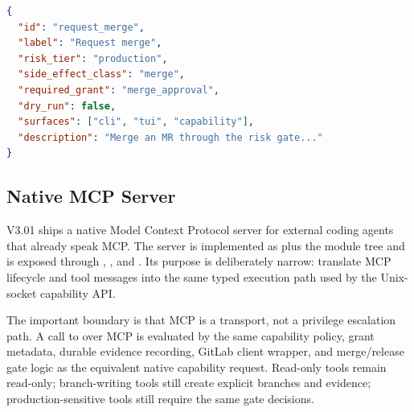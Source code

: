 \begin{lstlisting}[style=api,language=json,caption={Action registry JSON excerpt}]
{
  "id": "request_merge",
  "label": "Request merge",
  "risk_tier": "production",
  "side_effect_class": "merge",
  "required_grant": "merge_approval",
  "dry_run": false,
  "surfaces": ["cli", "tui", "capability"],
  "description": "Merge an MR through the risk gate..."
}
\end{lstlisting}

\clearpage
\twocolumn
\flushbottom
\subsection{Native MCP Server}
\label{app:mcp-server}

V3.01 ships a native Model Context Protocol server for external coding agents that already speak MCP. The server is implemented as  plus the  module tree and is exposed through , , and . Its purpose is deliberately narrow: translate MCP lifecycle and tool messages into the same typed  execution path used by the Unix-socket capability API.

The important boundary is that MCP is a transport, not a privilege escalation path. A call to  over MCP is evaluated by the same capability policy, grant metadata, durable evidence recording, GitLab client wrapper, and merge/release gate logic as the equivalent native capability request. Read-only tools remain read-only; branch-writing tools still create explicit branches and evidence; production-sensitive tools still require the same gate decisions.

